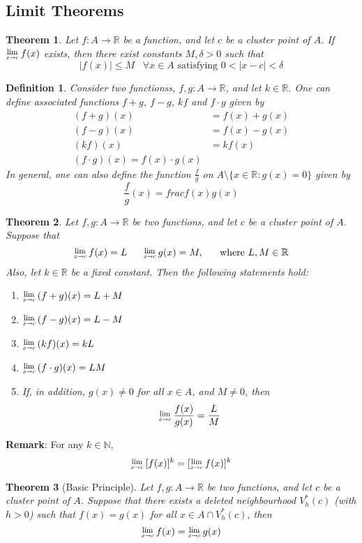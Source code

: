 \documentclass[12pt]{article}
\newcommand{\Lim}[1]{\raisebox{0.5ex}{\scalebox{0.8}{$\displaystyle \lim_{#1}\;$}}}
\newtheorem{definition}{Definition}[section]
\newtheorem{theorem}{Theorem}[section]
\theoremstyle{definition}
\begin{document}
\subsection{Limit Theorems}
\begin{theorem}\normalfont Let $f:A\to \mathbb{R}$ be a function, and let $c$ be a cluster point of $A$. If $\Lim{x\to c}f(x)$ exists, then there exist constants $M,\delta>0$ such that
\[
|f(x)|\leq M\;\;\;\forall x\in A\text{ satisfying }0<|x-c|<\delta
\] 
\end{theorem}
\begin{definition}\normalfont Consider two functionss, $f,g:A\to\mathbb{R}$, and let $k\in\mathbb{R}$. One can define associated functions $f+g$, $f-g$, $kf$ and $f\cdot g$ given by
\[
\begin{aligned}
(f+g)(x)&=f(x)+g(x)\\
(f-g)(x)&=f(x)-g(x)\\
(kf)(x)&=kf(x)\\
(f\cdot g)(x)=f(x)\cdot g(x)
\end{aligned}
\]
In general, one can also define the function $\frac{f}{g}$ on $A\setminus\{x\in\mathbb{R}:g(x)=0\}$ given by
\[
\frac{f}{g}(x)=frac{f(x)}{g(x)}
\]
\end{definition}
\begin{theorem}\normalfont Let $f,g:A\to\mathbb{R}$ be two functions, and let $c$ be a cluster point of $A$. Suppose that
\[
\Lim{x\to c}f(x)=L\;\;\;\;\;\;\Lim{x\to c}g(x)=M,\;\;\;\;\;\;\text{where }L,M\in\mathbb{R}
\]
Also, let $k\in\mathbb{R}$ be a fixed constant. Then the following statements hold:
\begin{enumerate}
\item $\Lim{x\to c}(f+g)(x)=L+M$
\item $\Lim{x\to c}(f-g)(x)=L-M$
\item $\Lim{x\to c}(kf)(x)=kL$
\item $\Lim{x\to c}(f\cdot g)(x)=LM$
\item If, in addition, $g(x)\neq 0$ for all $x\in A$, and $M\neq 0$, then
\[
\Lim{x\to c}\frac{f(x)}{g(x)}=\frac{L}{M}
\]
\end{enumerate}
\end{theorem}
\textbf{Remark}: For any $k\in\mathbb{N}$,
\[
\Lim{x\to c}[f(x)]^k=[\Lim{x\to c}f(x)]^k
\]
\begin{theorem}[Basic Principle]
\normalfont Let $f,g: A\to \mathbb{R}$ be two functions, and let $c$ be a cluster point of $A$. Suppose that there exists a deleted neighbourhood $V_h^\ast(c)$ (with $h>0$) such that $f(x)=g(x)$ for all $x\in A\cap V_h^\ast (c)$, then
\[
\Lim{x\to c}f(x)=\Lim{x\to c}g(x)
\]
\end{theorem}
\end{document}
